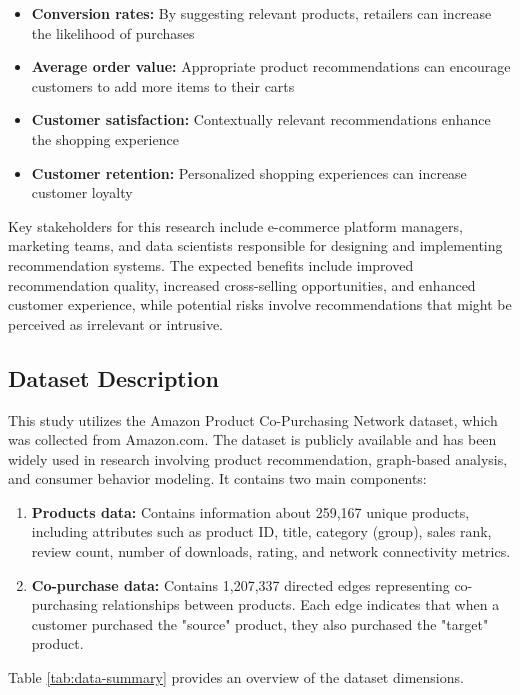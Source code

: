 \documentclass[conference]{IEEEtran}
\begin{document}
\begin{itemize}
    \item \textbf{Conversion rates:} By suggesting relevant products, retailers can increase the likelihood of purchases
    \item \textbf{Average order value:} Appropriate product recommendations can encourage customers to add more items to their carts
    \item \textbf{Customer satisfaction:} Contextually relevant recommendations enhance the shopping experience
    \item \textbf{Customer retention:} Personalized shopping experiences can increase customer loyalty
\end{itemize}

Key stakeholders for this research include e-commerce platform managers, marketing teams, and data scientists responsible for designing and implementing recommendation systems. The expected benefits include improved recommendation quality, increased cross-selling opportunities, and enhanced customer experience, while potential risks involve recommendations that might be perceived as irrelevant or intrusive.

\subsection{Dataset Description}
This study utilizes the Amazon Product Co-Purchasing Network dataset, which was collected from Amazon.com. The dataset is publicly available and has been widely used in research involving product recommendation, graph-based analysis, and consumer behavior modeling. It contains two main components:

\begin{enumerate}
    \item \textbf{Products data:} Contains information about 259,167 unique products, including attributes such as product ID, title, category (group), sales rank, review count, number of downloads, rating, and network connectivity metrics.
    
    \item \textbf{Co-purchase data:} Contains 1,207,337 directed edges representing co-purchasing relationships between products. Each edge indicates that when a customer purchased the "source" product, they also purchased the "target" product.
\end{enumerate}

Table \ref{tab:data-summary} provides an overview of the dataset dimensions.
\end{document}
